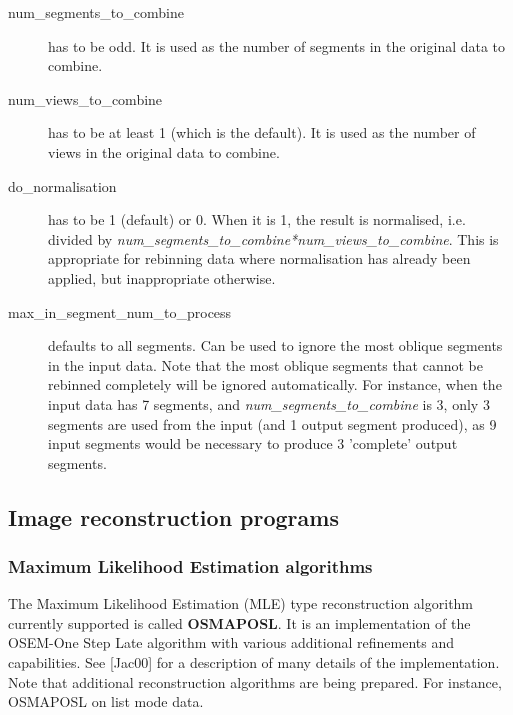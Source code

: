 \documentclass{article}
\begin{document}
\begin{description}
\item[num\_segments\_to\_combine] has to be odd. It is used as the 
number of segments in the original data to combine.
\item[num\_views\_to\_combine] has to be at least 1 (which 
is the default). It is used as the number of views in the original 
data to combine.
\item[do\_normalisation] has to be 1 (default) or 0. When it is 1, 
the result is normalised, i.e. divided by \textit{num\_segments\_to\_combine*num\_views\_to\_combine}. 
This is appropriate for rebinning data where normalisation has 
already been applied, but inappropriate otherwise.

\item[max\_in\_segment\_num\_to\_process] defaults to all segments. 
Can be used to ignore the most oblique segments in the input 
data. Note that the most oblique segments that cannot be rebinned 
completely will be ignored automatically. For instance, when 
the input data has 7 segments, and \textit{num\_segments\_to\_combine} is 
3, only 3 segments are used from the input (and 1 output segment 
produced), as 9 input segments would be necessary to produce 
3 'complete' output segments.
\end{description}


\subsection{
Image reconstruction programs}




\subsubsection{
Maximum Likelihood Estimation algorithms}

The Maximum Likelihood Estimation (MLE) type reconstruction algorithm 
currently supported is called \textbf{OSMAPOSL}. It is an implementation 
of the OSEM-One Step Late algorithm with various additional refinements 
and capabilities. See [Jac00] for a description of many details of the
implementation.\\
Note that additional reconstruction algorithms are being prepared. For instance, 
OSMAPOSL on list mode data.

{ 
}
\label{sec:OSMAPOSL}
\end{document}
